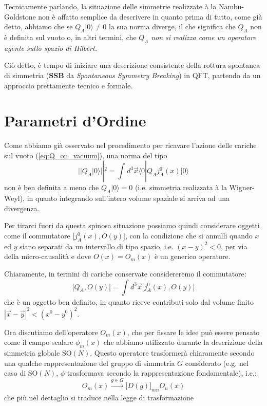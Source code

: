 \documentclass[../main.tex]{subfiles}
\begin{document}
Tecnicamente parlando, la situazione delle simmetrie realizzate à la Nambu-Goldstone non è affatto semplice da descrivere in quanto prima di tutto, come già detto, abbiamo che se $Q_A|0\rangle\neq 0$ la sua norma diverge, il che significa che $Q_A$ non è definita sul vuoto o, in altri termini, che $Q_A$ \textit{non si realizza come un operatore agente sullo spazio di Hilbert.}

Ciò detto, è tempo di iniziare una descrizione consistente della rottura spontanea di simmetria (\textbf{SSB} da \textit{Spontaneous Symmetry Breaking}) in QFT, partendo da un approccio prettamente tecnico e formale.

\section{Parametri d'Ordine}
Come abbiamo già osservato nel procedimento per ricavare l'azione delle cariche sul vuoto (\ref{eq:Q_on_vacuum}), una norma del tipo
\[
||Q_A|0\rangle||^2 = \int_{}d^3\Vec{x}\langle 0 |{Q}_{A}{j}_A^0(x)| 0\rangle
\]
non è ben definita a meno che $Q_A|0\rangle = 0$ (i.e. simmetria realizzata à la Wigner-Weyl), in quanto integrando sull'intero volume spaziale si arriva ad una divergenza.

Per tirarci fuori da questa spinosa situazione possiamo quindi considerare oggetti come il commutatore $\big[{j}_A^0(x), O(y)\big]$, con la condizione che si annulli quando $x$ ed $y$ siano separati da un intervallo di tipo spazio, i.e. $(x-y)^2<0$, per via della micro-causalità e dove $O(x)=O_m(x)$ è un generico operatore.

Chiaramente, in termini di cariche conservate considereremo il commutatore:
\begin{equation}
    \big[Q_A, O(y)\big] = \int_{}d^3\Vec{x} \big[{j}_A^0(x), O(y)\big]
    \label{eq:non_diverging_charge_commutator}
\end{equation}
che è un oggetto ben definito, in quanto riceve contributi solo dal volume finito $|\Vec{x} - \Vec{y}|^2<(x^0-y^0)^2$.

Ora discutiamo dell'operatore $O_m(x)$, che per fissare le idee può essere pensato come il campo scalare $\phi_m(x)$ che abbiamo utilizzato durante la descrizione della simmetria globale $\textrm{SO}(N)$. Questo operatore trasformerà chiaramente secondo una qualche rappresentazione del gruppo di simmetria $G$ considerato (e.g. nel caso di $\textrm{SO}(N)$, $\phi$ trasformava secondo la rappresentazione fondamentale), i.e.:
\[
O_m(x) \xrightarrow[]{g\in G}\big[D(g)\big]_{mn}O_n(x)
\]
che più nel dettaglio si traduce nella legge di trasformazione 
\end{document}
